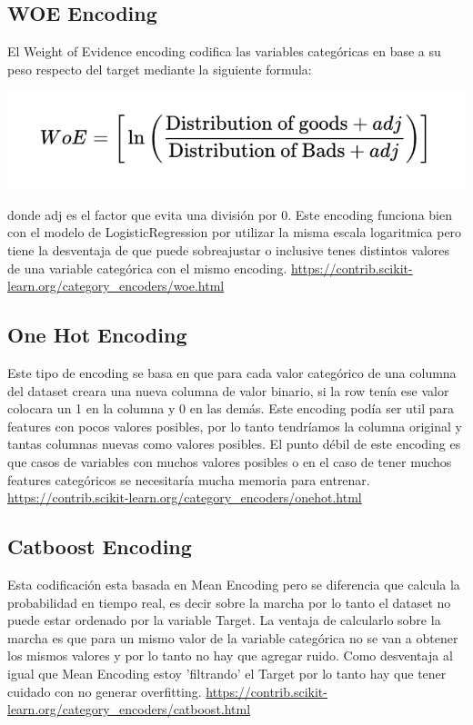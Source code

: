 \documentclass[12pt,a4paper]{article}
\begin{document}
\subsection{WOE Encoding}
El Weight of Evidence encoding codifica las variables categóricas en base a su peso respecto del target mediante la siguiente formula:
\begin{center}
    \includegraphics[scale=0.5]{imgs/WOE.png}
\end{center}
donde adj es el factor que evita una división por 0.
Este encoding funciona bien con el modelo de LogisticRegression por utilizar la misma escala logaritmica pero tiene la desventaja de que puede sobreajustar o inclusive tenes distintos valores de una variable categórica con el mismo encoding. 
\url{https://contrib.scikit-learn.org/category_encoders/woe.html}

\subsection{One Hot Encoding}
Este tipo de encoding se basa en que para cada valor categórico de una columna del dataset creara una nueva columna de valor binario, si la row tenía ese valor colocara un 1 en la columna y 0 en las demás. Este encoding podía ser util para features con pocos valores posibles, por lo tanto tendríamos la columna original y tantas columnas nuevas como valores posibles. El punto débil de este encoding es que casos de variables con muchos valores posibles o en el caso de tener muchos features categóricos se necesitaría mucha memoria para entrenar.
\url{https://contrib.scikit-learn.org/category_encoders/onehot.html}

\subsection{Catboost Encoding}
Esta codificación esta basada en Mean Encoding pero se diferencia que calcula la probabilidad en tiempo real, es decir sobre la marcha por lo tanto el dataset no puede estar ordenado por la variable Target. La ventaja de calcularlo sobre la marcha es que para un mismo valor de la variable categórica no se van a obtener los mismos valores y por lo tanto no hay que agregar ruido. Como desventaja al igual que Mean Encoding estoy 'filtrando' el Target por lo tanto hay que tener cuidado con no generar overfitting.
\url{https://contrib.scikit-learn.org/category_encoders/catboost.html}
\end{document}

